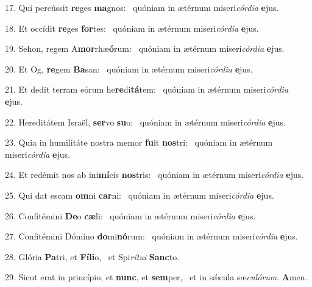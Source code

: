 17. Qui percússit \textbf{re}ges \textbf{ma}gnos: \ast\  quóniam in ætérnum miseri\textit{cór}\textit{di}\textit{a} \textbf{e}jus.\

18. Et occídit \textbf{re}ges \textbf{for}tes: \ast\  quóniam in ætérnum miseri\textit{cór}\textit{di}\textit{a} \textbf{e}jus.\

19. Sehon, regem A\textbf{mor}rhæ\textbf{ó}rum: \ast\  quóniam in ætérnum miseri\textit{cór}\textit{di}\textit{a} \textbf{e}jus.\

20. Et Og, \textbf{re}gem \textbf{Ba}san: \ast\  quóniam in ætérnum miseri\textit{cór}\textit{di}\textit{a} \textbf{e}jus.\

21. Et dedit terram eórum he\textbf{re}di\textbf{tá}tem: \ast\  quóniam in ætérnum miseri\textit{cór}\textit{di}\textit{a} \textbf{e}jus.\

22. Hereditátem Israël, \textbf{ser}vo \textbf{su}o: \ast\  quóniam in ætérnum miseri\textit{cór}\textit{di}\textit{a} \textbf{e}jus.\

23. Quia in humilitáte nostra memor \textbf{fu}it \textbf{nos}tri: \ast\  quóniam in ætérnum miseri\textit{cór}\textit{di}\textit{a} \textbf{e}jus.\

24. Et redémit nos ab ini\textbf{mí}cis \textbf{nos}tris: \ast\  quóniam in ætérnum miseri\textit{cór}\textit{di}\textit{a} \textbf{e}jus.\

25. Qui dat escam \textbf{om}ni \textbf{car}ni: \ast\  quóniam in ætérnum miseri\textit{cór}\textit{di}\textit{a} \textbf{e}jus.\

26. Confitémini \textbf{De}o \textbf{cæ}li: \ast\  quóniam in ætérnum miseri\textit{cór}\textit{di}\textit{a} \textbf{e}jus.\

27. Confitémini Dómino \textbf{do}mi\textbf{nó}rum: \ast\  quóniam in ætérnum miseri\textit{cór}\textit{di}\textit{a} \textbf{e}jus.\

28. Glória \textbf{Pa}tri, et \textbf{Fí}\textbf{li}o, \ast\  et Spi\textit{rí}\textit{tu}\textit{i} \textbf{Sanc}to.\

29. Sicut erat in princípio, et \textbf{nunc}, et \textbf{sem}per, \ast\  et in sǽcula sæ\textit{cu}\textit{ló}\textit{rum}. \textbf{A}men.\

